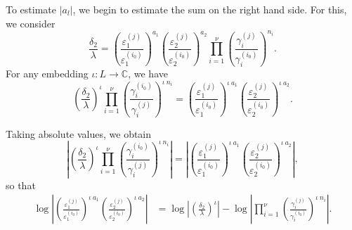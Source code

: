 To estimate $|a_l|$, we begin to estimate the sum on the right hand side. For this, we consider
\[\frac{\delta_2}{\lambda}= \left( \frac{\varepsilon_1^{(j)}}{\varepsilon_1^{(i_0)}}\right)^{a_1}\left( \frac{\varepsilon_2^{(j)}}{\varepsilon_2^{(i_0)}}\right)^{a_2}\prod_{i = 1}^{\nu} \left( \frac{\gamma_i^{(j)}}{\gamma_i^{(i_0)}}\right)^{n_i}.\]
For any embedding $\iota: L \to \mathbb{C}$, we have 
\[\left(\frac{\delta_2}{\lambda}\right)^{\iota} \prod_{i = 1}^{\nu} \left( \frac{\gamma_i^{(i_0)}}{\gamma_i^{(j)}}\right)^{\iota \ n_i} =  \left( \frac{\varepsilon_1^{(j)}}{\varepsilon_1^{(i_0)}}\right)^{\iota \ a_1}\left( \frac{\varepsilon_2^{(j)}}{\varepsilon_2^{(i_0)}}\right)^{\iota \ a_2}.\] 

Taking absolute values, we obtain
\[\left|\left(\frac{\delta_2}{\lambda}\right)^{\iota} \prod_{i = 1}^{\nu} \left( \frac{\gamma_i^{(i_0)}}{\gamma_i^{(j)}}\right)^{\iota \ n_i}\right| = \left|\left( \frac{\varepsilon_1^{(j)}}{\varepsilon_1^{(i_0)}}\right)^{\iota \ a_1}\left( \frac{\varepsilon_2^{(j)}}{\varepsilon_2^{(i_0)}}\right)^{\iota \ a_2}\right|,\]
so that
\begin{align*}
\log\left|\left( \frac{\varepsilon_1^{(j)}}{\varepsilon_1^{(i_0)}}\right)^{\iota \ a_1}\left( \frac{\varepsilon_2^{(j)}}{\varepsilon_2^{(i_0)}}\right)^{\iota \ a_2}\right|
	& = \log\left|\left(\frac{\delta_2}{\lambda}\right)^{\iota}\right| - \log\left| \prod_{i = 1}^{\nu} \left( \frac{\gamma_i^{(j)}}{\gamma_i^{(i_0)}}\right)^{\iota \ n_i}\right|. 
\end{align*}

